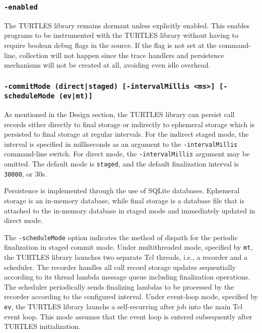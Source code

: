 \documentclass{article}[letter,10pt]
\begin{document}
{{    \subsubsection{\texttt{-enabled}}{
      The TURTLES library remains dormant unless explicitly enabled. This enables programs to
      be instrumented with the TURTLES library without having to require boolean debug flags
      in the source. If the flag is not set at the command-line, collection will not happen
      since the trace handlers and persistence mechanisms will not be created at all, avoiding
      even idle overhead.
    }
    \subsubsection{\texttt{-commitMode (direct|staged) [-intervalMillis <ms>] [-scheduleMode (ev|mt)]}}{
      As mentioned in the Design section, the TURTLES library can persist call records
      either directly to final storage or indirectly to ephemeral storage which is
      persisted to final storage at regular intervals. For the indirect staged mode,
      the interval is specified in milliseconds as an argument to the \texttt{-intervalMillis}
      command-line switch. For direct mode, the \texttt{-intervalMillis} argument may be
      omitted. The default mode is \texttt{staged}, and the default finalization
      interval is \texttt{30000}, or 30s.

      Persistence is implemented through the use of SQLite databases. Ephemeral
      storage is an in-memory database, while final storage is a database file
      that is attached to the in-memory database in staged mode and immediately
      updated in direct mode.

      The \texttt{-scheduleMode} option indicates the method of dispath for the periodic
      finalization in staged commit mode. Under multithreaded mode, specified by \texttt{mt},
      the TURTLES library launches two separate Tcl threads, i.e., a recorder and a scheduler.
      The recorder handles all call record storage updates sequentially according to its thread
      lambda message queue including finalization operations. The scheduler periodically sends
      finalizing lambdas to be processed by the recorder according to the configured interval.
      Under event-loop mode, specified by \texttt{ev}, the TURTLES library launchs a self-recurring
      after job into the main Tcl event loop. This mode assumes that the event loop is entered
      subsequently after TURTLES initialization.
    }
}}
\end{document}
